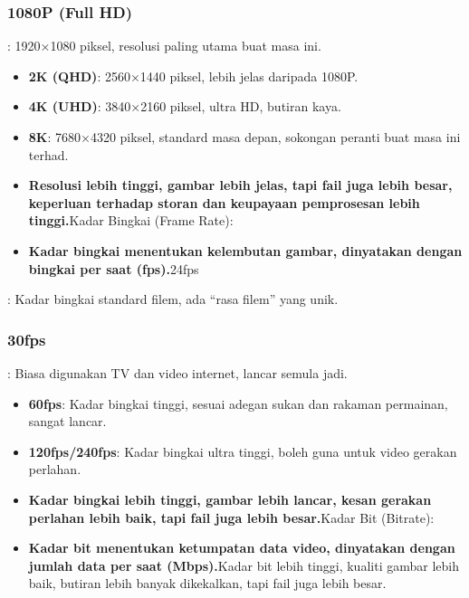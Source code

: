 


\subsubsection*{1080P (Full HD)}

: 1920×1080 piksel, resolusi paling utama buat masa ini.

\begin{itemize}
  \item \textbf{2K (QHD)}: 2560×1440 piksel, lebih jelas daripada 1080P.
  \item \textbf{4K (UHD)}: 3840×2160 piksel, ultra HD, butiran kaya.
  \item \textbf{8K}: 7680×4320 piksel, standard masa depan, sokongan peranti buat masa ini terhad.
  \item \textbf{Resolusi lebih tinggi, gambar lebih jelas, tapi fail juga lebih besar, keperluan terhadap storan dan keupayaan pemprosesan lebih tinggi.}Kadar Bingkai (Frame Rate):
  \item \textbf{Kadar bingkai menentukan kelembutan gambar, dinyatakan dengan bingkai per saat (fps).}24fps
\end{itemize}

: Kadar bingkai standard filem, ada “rasa filem” yang unik.

\subsubsection*{30fps}

: Biasa digunakan TV dan video internet, lancar semula jadi.

\begin{itemize}
  \item \textbf{60fps}: Kadar bingkai tinggi, sesuai adegan sukan dan rakaman permainan, sangat lancar.
  \item \textbf{120fps/240fps}: Kadar bingkai ultra tinggi, boleh guna untuk video gerakan perlahan.
  \item \textbf{Kadar bingkai lebih tinggi, gambar lebih lancar, kesan gerakan perlahan lebih baik, tapi fail juga lebih besar.}Kadar Bit (Bitrate):
  \item \textbf{Kadar bit menentukan ketumpatan data video, dinyatakan dengan jumlah data per saat (Mbps).}Kadar bit lebih tinggi, kualiti gambar lebih baik, butiran lebih banyak dikekalkan, tapi fail juga lebih besar.
\end{itemize}

